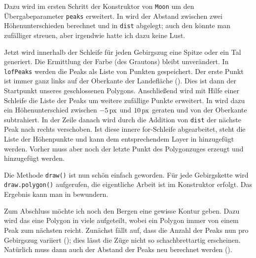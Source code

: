 Dazu wird im ersten Schritt der Konstruktor von \texttt{Moon} um den Übergabeparameter \texttt{peaks} erweitert. In  wird der Abstand zwischen zwei Höhenunterschieden berechnet und in \texttt{dist} abgelegt; auch den könnte man zufälliger streuen, aber irgendwie hatte ich dazu keine Lust.

\begin{figure}%
	\begin{center}%
		\vspace{-1cm}%
	\end{center}%
\end{figure}%
Jetzt wird innerhalb der Schleife für jeden Gebirgszug eine Spitze oder ein Tal generiert. Die Ermittlung der Farbe (des Grautons) bleibt unverändert. In \texttt{lofPeaks} werden die Peaks als Liste von Punkten gespeichert. Der erste Punkt ist immer ganz links auf der Oberkante der Landefläche (). Dies ist dann der Startpunkt unseres geschlossenen Polygons. Anschließend wird mit Hilfe einer Schleife die Liste der Peaks um weitere zufällige Punkte erweitert. In  wird dazu ein Höhenunterschied zwischen $\unit[-5]{px}$ und $\unit[10]{px}$ geraten und von der Oberkante subtrahiert. In der Zeile danach wird durch die Addition von \texttt{dist} der nächste Peak nach rechts verschoben. Ist diese innere for-Schleife abgearbeitet, steht die Liste der Höhenpunkte und kann dem ent\-sprech\-endem Layer in  hinzugefügt werden. Vorher muss aber noch der letzte Punkt des Polygonzuges erzeugt und hinzugefügt werden.


Die Methode \texttt{draw()} ist nun schön einfach geworden. Für jede Gebirgskette wird \texttt{draw.\-poly\-gon()} aufgerufen, die eigentliche Arbeit ist im Konstruktor erfolgt. Das Ergebnis kann man in  bewundern.

\newpage
{}

\begin{figure}%
	\begin{center}%
		\vspace{-1cm}%
	\end{center}%
\end{figure}%
Zum Abschluss möchte ich noch den Bergen eine gewisse Kontur geben. Dazu wird das eine Polygon in viele aufgeteilt, wobei ein Polygon immer von einem Peak zum nächsten reicht. Zunächst fällt auf, dass die Anzahl der Peaks nun pro Gebirgszug variiert (); dies lässt die Züge nicht so schachbrettartig erscheinen. Natürlich muss dann auch der Abstand der Peaks neu berechnet werden (). 

